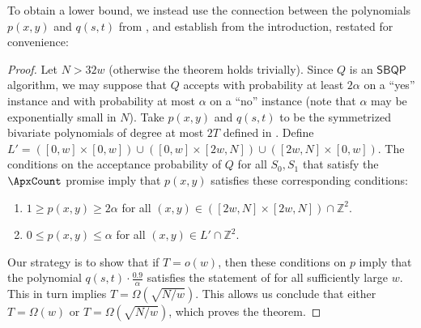To obtain a lower bound, we
instead use the connection between the polynomials $p(x,y)$ and $q(s,t)$
from , and establish  from the
introduction, restated for convenience:

\sbqp*

\begin{proof}
Let $N > 32w$ (otherwise the theorem holds trivially). Since $Q$ is an $\mathsf{SBQP}$ algorithm, we may suppose that $Q$ accepts with probability at least $2\alpha$ on a ``yes'' instance and with probability at most $\alpha$ on a ``no'' instance (note that $\alpha$ may be exponentially small in $N$). Take $p(x,y)$ and $q(s, t)$ to be the symmetrized bivariate polynomials of degree at most $2T$ defined in . Define $L' = ([0, w] \times [0, w]) \cup ([0, w] \times [2w, N]) \cup ([2w, N] \times [0, w])$. The conditions on the acceptance probability of $Q$ for all $S_0, S_1$ that satisfy the $\ApxCount$ promise imply that $p(x, y)$ satisfies these corresponding conditions:
\begin{enumerate}
\item $1 \ge p(x, y) \ge 2\alpha$ for all $(x, y) \in \left([2w, N] \times [2w, N]\right) \cap \mathbb{Z}^2$.
\item $0 \le p(x, y) \le \alpha$ for all $(x, y) \in L' \cap \mathbb{Z}^2$.
\end{enumerate}

Our strategy is to show that if $T = o(w)$, then these conditions on $p$ imply that the polynomial $q(s, t) \cdot \frac{0.9}{\alpha}$ satisfies the statement of  for all sufficiently large $w$. This in turn implies $T = \Omega(\sqrt{N/w})$. This allows us conclude that either $T = \Omega(w)$ or $T = \Omega(\sqrt{N/w})$, which proves the theorem.


\end{proof}
